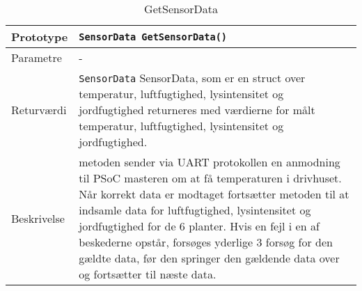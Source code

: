 \begin{table}[h]
\begin{tabularx}{\textwidth}{| >{\raggedright\arraybackslash}p{2.5 cm} | >{\raggedright\arraybackslash}X |} \hline
Prototype & \texttt{SensorData GetSensorData() } \\\hline
Parametre & - \\\hline
Returværdi &\texttt{SensorData} \newline
SensorData, som er en struct over temperatur, luftfugtighed, lysintensitet og jordfugtighed returneres med værdierne for målt temperatur, luftfugtighed, lysintensitet og jordfugtighed. \\\hline
Beskrivelse & metoden sender via UART protokollen en anmodning til PSoC masteren om at få temperaturen i drivhuset. Når korrekt data er modtaget fortsætter metoden til at indsamle data for luftfugtighed, lysintensitet og jordfugtighed for de 6 planter. Hvis en fejl i en af beskederne opstår, forsøges yderlige 3 forsøg for den gældte data, før den springer den gældende data over og fortsætter til næste data.  \\\hline
\end{tabularx}
\caption{GetSensorData}
\label{table:GetSensorData}
\end{table}

\clearpage